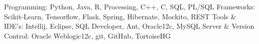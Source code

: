 \begin{cvskills}
  \cvskill
    {Programming:}
    {Python, Java, R, Processing, C++, C, SQL, PL/SQL}
  \cvskill
    {Frameworks:}
    {Scikit-Learn, Tensorflow, Flask, Spring, Hibernate, Mockito, REST}
  \cvskill
    {Tools \& IDE's:}
    {Intellij, Eclipse, SQL Developer, Ant, Oracle12c, MySQL}
  \cvskill
    {Server \& Version Control:}
    {Oracle Weblogic12c, git, GitHub, TortoiseHG}
\end{cvskills}
